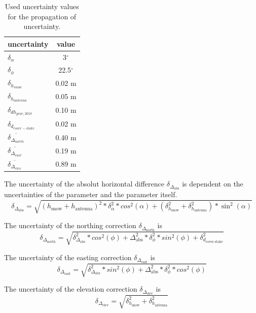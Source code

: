 \begin{table}[H]
	\caption{Used uncertainty values for the propagation of uncertainty.}
	\centering
	\begin{tabular}{lc}
	\toprule
        uncertainty &  value \\
	\midrule
    $ \delta_{\alpha} $ &  3$^{\circ}$ \\
    $ \delta_{\phi} $ &  22.5$^{\circ}$ \\
    $ \delta_{h_{snow}}$ &  0.02 m \\
    $ \delta_{h_{antenna}} $ &  0.05 m \\
    $ \delta_{dh_{year,2018}} $ &  0.10 m \\
    $ \delta_{d_{rover-stake}} $ &  0.02 m \\
    $ \overline{\delta_{\Delta_{north}}} $ & 0.40 m \\
    $ \overline{\delta_{\Delta_{east}}} $ & 0.19 m \\
    $ \overline{\delta_{\Delta_{elev}}} $ & 0.89 m \\
    \bottomrule
	\end{tabular}
	\label{GPS:tab:errors}
\end{table} 

The uncertainty of the absolut horizontal difference $\delta_{\Delta_{\text{abs}}}$ is dependent on the uncertainties of the parameter and the parameter itself.
\begin{equation}
	\delta_{\Delta_{\text{abs}}} = \sqrt{(h_{\text{snow}} + h_{\text{antenna}})^2 * \delta_{\alpha}^2 * cos^2(\alpha) + (\delta_{h_{\text{snow}}}^2 + \delta_{h_{\text{antenna}}}^2) * \sin^2(\alpha)}
\end{equation}

The uncertainty of the northing correction $\delta_{\Delta_{\text{north}}}$ is
\begin{equation}
	\delta_{\Delta_{\text{north}}} = \sqrt{\delta_{\Delta_{\text{abs}}}^2 * cos^2(\phi) + \Delta_{\text{abs}}^2 * \delta_{\phi}^2 * sin^2(\phi) + \delta_{d_{\text{rover-stake}}}^2}
\end{equation}

The uncertainty of the easting correction $\delta_{\Delta_{\text{east}}}$ is
\begin{equation}
	\delta_{\Delta_{\text{east}}} = \sqrt{\delta_{\Delta_{\text{abs}}}^2 * sin^2(\phi) + \Delta_{\text{abs}}^2 * \delta_{\phi}^2 * cos^2(\phi)}
\end{equation}

The uncertainty of the elevation correction $\delta_{\Delta_{\text{elev}}}$ is
\begin{equation}
\delta_{\Delta_{\text{elev}}} = \sqrt{\delta_{h_{\text{snow}}}^2 + \delta_{h_{\text{antenna}}}^2}
\end{equation}
	

